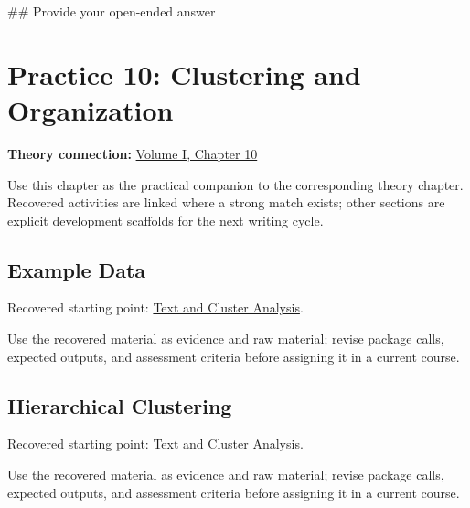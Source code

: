\documentclass[
  letterpaper,
]{scrbook}
\newenvironment{Shaded}{\begin{snugshade}}{\end{snugshade}}
\newcommand{\CommentTok}[1]{\textcolor[rgb]{0.37,0.37,0.37}{#1}}
\begin{document}
\begin{Shaded}
\begin{Highlighting}[]
\CommentTok{\#\# Provide your open{-}ended answer}
\end{Highlighting}
\end{Shaded}

\chapter*{Practice 10: Clustering and
Organization}\label{ch-practice-10}


\textbf{Theory connection:} \hyperref[ch-clustering]{Volume I, Chapter
10}

Use this chapter as the practical companion to the corresponding theory
chapter. Recovered activities are linked where a strong match exists;
other sections are explicit development scaffolds for the next writing
cycle.

\section*{Example Data}\label{sec-pr-10-example-data}


Recovered starting point: \hyperref[sec-lab-clustering]{Text and Cluster
Analysis}.

Use the recovered material as evidence and raw material; revise package
calls, expected outputs, and assessment criteria before assigning it in
a current course.

\section*{Hierarchical
Clustering}\label{sec-pr-10-hierarchical-clustering}


Recovered starting point: \hyperref[sec-lab-clustering]{Text and Cluster
Analysis}.

Use the recovered material as evidence and raw material; revise package
calls, expected outputs, and assessment criteria before assigning it in
a current course.
\end{document}
